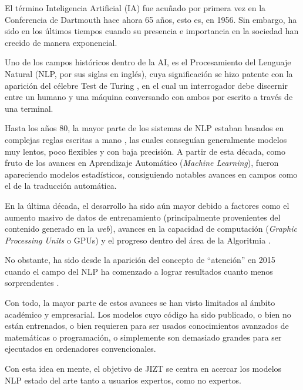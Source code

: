   \label{chapter:intro}

\vspace{-0.07cm}

El término Inteligencia Artificial (IA) fue acuñado por primera vez en la Conferencia de Dartmouth \cite{crevier95} hace ahora 65 años, esto es, en 1956. Sin embargo, ha sido en los últimos tiempos cuando su presencia e importancia en la sociedad han crecido de manera exponencial.

Uno de los campos históricos dentro de la AI, es el Procesamiento del Lenguaje Natural (NLP, por sus siglas en inglés), cuya significación se hizo patente con la aparición del célebre Test de Turing \cite{turing50}, en el cual un interrogador debe discernir entre un humano y una máquina conversando con ambos por escrito a través de una terminal.

Hasta los años 80, la mayor parte de los sistemas de NLP estaban basados en complejas reglas escritas a mano \cite{mccorduck79}, las cuales conseguían generalmente modelos muy lentos, poco flexibles y con baja precisión. A partir de esta década, como fruto de los avances en Aprendizaje Automático (\emph{Machine Learning}), fueron apareciendo modelos estadísticos, consiguiendo notables avances en campos como el de la traducción automática.

En la última década, el desarrollo ha sido aún mayor debido a factores como el aumento masivo de datos de entrenamiento (principalmente provenientes del contenido generado en la \emph{web}), avances en la capacidad de computación (\emph{Graphic Processing Units} o GPUs) y el progreso dentro del área de la Algoritmia \cite{rahmfeld19}.

No obstante, ha sido desde la aparición del concepto de ``atención'' en 2015 \cite{luong15, bahdanau16, vaswani17} cuando el campo del NLP ha comenzado a lograr resultados cuanto menos sorprendentes \cite{macaulay20, wiggers21}.

Con todo, la mayor parte de estos avances se han visto limitados al ámbito académico y empresarial. Los modelos cuyo código ha sido publicado, o bien no están entrenados, o bien requieren para ser usados conocimientos avanzados de matemáticas o programación, o simplemente son demasiado grandes para ser ejecutados en ordenadores convencionales.

Con esta idea en mente, el objetivo de JIZT se centra en acercar los modelos NLP estado del arte tanto a usuarios expertos, como no expertos.

